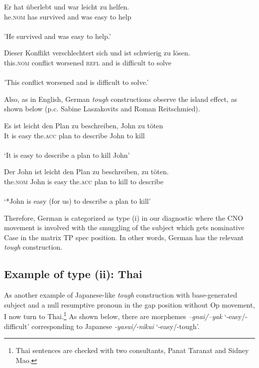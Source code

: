 \documentclass[output=paper,colorlinks,citecolor=brown,
]{langscibook}
\begin{document}
\begin{exe}
\ex \label{23ha}
\gll *Er hat  überlebt und \underline{\hspace{6mm}} war leicht zu helfen.\\
he.\textsc{nom} has survived and {} was easy to help\\\\
'He survived and \underline{\hspace{6mm}} was easy to help.'       

\ex \label{24ha}
\gll Dieser Konflikt verschlechtert sich und \underline{\hspace{6mm}} ist schwierig zu lösen.\\
this.\textsc{nom} conflict worsened \textsc{refl} and {} is difficult to solve\\\\
'This conflict worsened and is difficult to solve.'    

\end{exe}

Also, as in English, German \textit{tough} constructions observe the island effect, as shown below (p.c. Sabine Laszakovits and Roman Reitschmied). 

\begin{exe}
\ex \label{25ha}
\begin{xlist}
\ex \label{25aha}
\gll Es ist leicht den Plan zu beschreiben, John zu töten\\
It is easy the.\textsc{acc} plan to describe John to kill\\\\
‘It is easy to describe a plan to kill John’


\ex \label{25bha}
\gll *Der John ist leicht den Plan zu beschreiben, \underline{\hspace{3mm}} zu töten. \\
the.\textsc{nom} John is easy the.\textsc{acc} plan to kill {} to describe\\\\
‘*John is easy (for us) to describe a plan to kill’

\end{xlist}
\end{exe}

Therefore, German is categorized as type (i) in our diagnostic where the CNO movement is involved with the smuggling of the subject which gets nominative Case in the matrix TP spec position. In other words, German has the relevant \textit{tough} construction.

\subsection{Example of type (ii): Thai} \label{s3.3ha}
As another example of Japanese-like \textit{tough} construction with base-generated subject and a null resumptive pronoun in the gap position without Op movement, I now turn to Thai.\footnote{Thai sentences are checked with two consultants, Panat Taranat and Sidney Mao.} As shown below, there are morphemes \textit{–gnai/–yak} ‘-easy/-difficult’ corresponding to Japanese \textit{-yasui/-nikui} ‘-easy/-tough’. 
\end{document}
